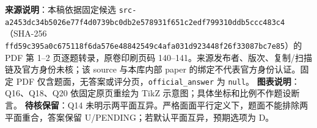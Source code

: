

\begin{gktip}
\textbf{来源说明}：本稿依据固定候选 \texttt{src-a2453dc34b5026e77f4d0739bc0db2e578931f651c2edf799310ddb5ccc483c4}（SHA-256 \texttt{ffd59c395a0c675118f6da576e48842549c4afa031d923448f26f33087bc7e85}）的 PDF 第 1–2 页逐题转录，原卷印刷页码 140–141。来源发布者、版次、复制/扫描链及官方身份未核；该 source 与本库内部 paper 的绑定不代表官方身份认证。固定 PDF 仅含题面，无答案或评分页，\texttt{official_answer} 为 \texttt{null}。
\textbf{图表说明}：Q16、Q18、Q20 依固定原页重绘为 TikZ 示意图；具体坐标和比例不作题设断言。
\textbf{待核保留}：Q14 未明示两平面互异。严格面面平行定义下，题面不能排除两平面重合，答案保留 U/PENDING；若默认平面互异，预期选项为 D。
\end{gktip}


